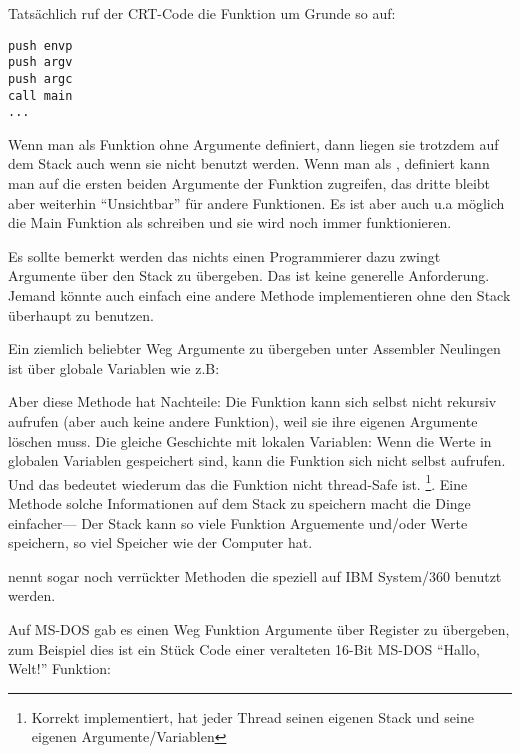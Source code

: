 Tatsächlich ruf der \ac{CRT}-Code die \main Funktion um Grunde so auf:
	
\begin{lstlisting}[style=customasm]
push envp
push argv
push argc
call main
...
\end{lstlisting}

Wenn man \main als \main Funktion ohne Argumente definiert, dann liegen sie trotzdem auf dem Stack auch wenn sie 
nicht benutzt werden. Wenn man \main als , definiert kann man auf die ersten beiden
Argumente der Funktion zugreifen, das dritte bleibt aber weiterhin ``Unsichtbar'' für andere Funktionen.
Es ist aber auch u.a möglich die Main Funktion als  schreiben und sie wird noch immer funktionieren.


Es sollte bemerkt werden das nichts einen Programmierer dazu zwingt Argumente über den Stack zu übergeben. Das ist
keine generelle Anforderung. Jemand könnte auch einfach eine andere Methode implementieren ohne den Stack überhaupt zu benutzen.

Ein ziemlich beliebter Weg Argumente zu übergeben unter Assembler Neulingen ist über globale Variablen wie z.B:



Aber diese Methode hat Nachteile: Die  Funktion kann sich selbst nicht rekursiv aufrufen (aber auch keine andere Funktion),
weil sie ihre eigenen Argumente löschen muss.
Die gleiche Geschichte mit lokalen Variablen: Wenn die Werte in globalen Variablen gespeichert sind, kann die Funktion sich nicht selbst aufrufen.
Und das bedeutet wiederum das die Funktion nicht thread-Safe ist.
\footnote{Korrekt implementiert, hat jeder Thread seinen eigenen Stack und seine eigenen Argumente/Variablen}.
Eine Methode solche Informationen auf dem Stack zu speichern macht die Dinge einfacher--- Der Stack kann so viele Funktion Arguemente und/oder Werte speichern,
so viel Speicher wie der Computer hat.

 nennt sogar noch verrückter Methoden die speziell auf IBM System/360 benutzt werden.


Auf MS-DOS gab es einen Weg Funktion Argumente über Register zu übergeben, zum Beispiel dies 
ist ein Stück Code einer veralteten 16-Bit MS-DOS ``Hallo, Welt!'' Funktion:

